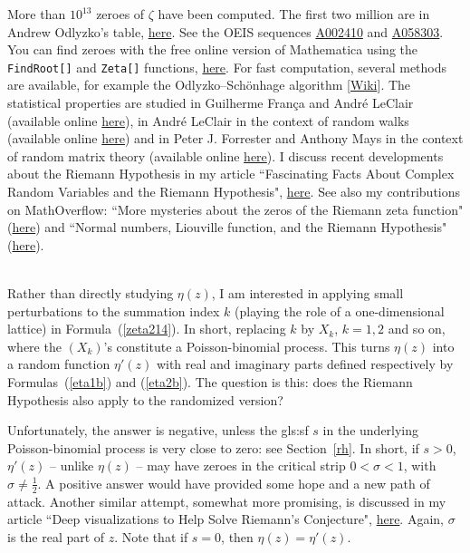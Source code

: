 \documentclass[10pt]{article}
\begin{document}
More than $10^{13}$ zeroes of $\zeta$ have been computed. The first two million are in Andrew Odlyzko's table,
\href{http://www.dtc.umn.edu/~odlyzko/zeta_tables/index.html}{here}. See the OEIS sequences
 \href{https://oeis.org/A002410}{A002410} and \href{https://oeis.org/A058303}{A058303}. You can find zeroes with the free online version of Mathematica using the \texttt{FindRoot[]} and \texttt{Zeta[]} functions, \href{https://bit.ly/3AXzAGl}{here}. 
 For fast computation, several methods are available, for example
the Odlyzko–Schönhage algorithm [\href{https://bit.ly/330YLeD}{Wiki}]. The statistical properties are studied in 
Guilherme França and André LeClair  \cite{rie34} 
(available online \href{https://arxiv.org/abs/1307.8395}{here}),
in André LeClair   in the context of random walks \cite{rie35} 
(available online \href{https://www.mdpi.com/2073-8994/13/11/2014}{here})
and in Peter J. Forrester and Anthony Mays in the context of random matrix theory \cite{may99} (available online \href{https://arxiv.org/abs/1506.06531}{here}). 
I discuss recent developments about the Riemann Hypothesis in my article ``Fascinating Facts About Complex Random Variables and the Riemann Hypothesis", \href{https://www.vgranville.com/2022/02/fascinating-facts-about-complex-random.html}{here}. See also my contributions on MathOverflow: ``More mysteries about the zeros of the Riemann zeta function"
(\href{https://mathoverflow.net/questions/379650/more-mysteries-about-the-zeros-of-the-riemann-zeta-function}{here}) and
 ``Normal numbers, Liouville function, and the Riemann Hypothesis"
 (\href{https://mathoverflow.net/questions/391736/normal-numbers-liouville-function-and-the-riemann-hypothesis}{here}). \\
\quad \\

\noindent  Rather than directly studying $\eta(z)$, I am interested in applying small perturbations to the summation index $k$ (playing the role of a one-dimensional lattice) in Formula~(\ref{zeta214}). In short, replacing $k$ by $X_k$, $k=1,2$ and so on, where the $(X_k)$'s constitute a Poisson-binomial process. This turns $\eta(z)$ into a \textcolor{index}{random function} 
$\eta'(z)$ with real and imaginary parts defined respectively by Formulas~(\ref{eta1b}) and (\ref{eta2b}). 
The question is this:  does the Riemann Hypothesis also apply to the randomized version? 

Unfortunately, the answer is negative, unless the \gls{gls:sf} $s$ in the underlying Poisson-binomial process is very close to zero: see Section~\ref{rh}. 
In short, if $s>0$, $\eta'(z)$ -- unlike $\eta(z)$ -- 
may have zeroes in the critical strip
$0<\sigma<1$, with $\sigma\neq \frac{1}{2}$. A positive answer would have provided some hope and a new path of attack. Another similar attempt, somewhat more promising, is discussed in my
article ``Deep visualizations to Help Solve Riemann's Conjecture", \href{https://www.vgranville.com/2022/02/deep-visualizations-to-help-solve.html}{here}. Again, $\sigma$ is the real part of $z$. Note that if $s=0$, then
$\eta(z)=\eta'(z)$.
\end{document}
